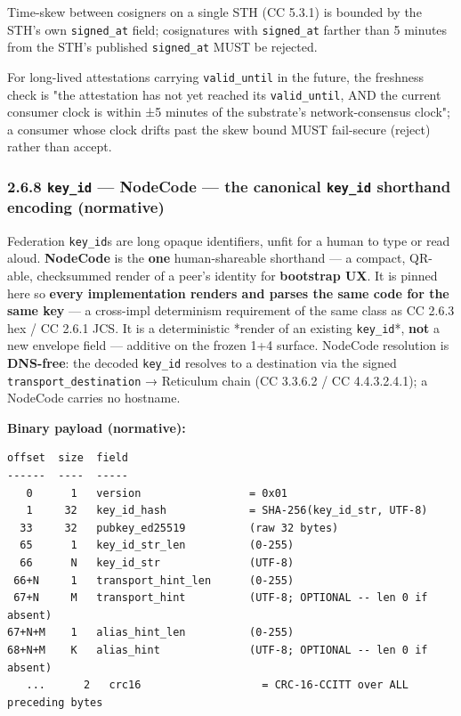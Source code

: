 \documentclass[11pt]{article}
\begin{document}
Time-skew between cosigners on a single STH (CC 5.3.1) is bounded by the STH's own \texttt{signed\_at} field; cosignatures with \texttt{signed\_at} farther than 5 minutes from the STH's published \texttt{signed\_at} MUST be rejected.


For long-lived attestations carrying \texttt{valid\_until} in the future, the freshness check is "the attestation has not yet reached its \texttt{valid\_until}, AND the current consumer clock is within ±5 minutes of the substrate's network-consensus clock"; a consumer whose clock drifts past the skew bound MUST fail-secure (reject) rather than accept.


\subsubsection*{2.6.8 \texttt{key\_id} — NodeCode — the canonical \texttt{key\_id} shorthand encoding (normative)}


Federation \texttt{key\_id}s are long opaque identifiers, unfit for a human to type or read aloud. \textbf{NodeCode} is the \textbf{one} human-shareable shorthand — a compact, QR-able, checksummed render of a peer's identity for \textbf{bootstrap UX}. It is pinned here so \textbf{every implementation renders and parses the same code for the same key} — a cross-impl determinism requirement of the same class as CC 2.6.3 hex / CC 2.6.1 JCS. It is a deterministic *render of an existing \texttt{key\_id}*, \textbf{not} a new envelope field — additive on the frozen 1+4 surface. NodeCode resolution is \textbf{DNS-free}: the decoded \texttt{key\_id} resolves to a destination via the signed \texttt{transport\_destination} → Reticulum chain (CC 3.3.6.2 / CC 4.4.3.2.4.1); a NodeCode carries no hostname.


\textbf{Binary payload (normative):}


\begin{lstlisting}
offset  size  field
------  ----  -----
   0      1   version                 = 0x01
   1     32   key_id_hash             = SHA-256(key_id_str, UTF-8)
  33     32   pubkey_ed25519          (raw 32 bytes)
  65      1   key_id_str_len          (0-255)
  66      N   key_id_str              (UTF-8)
 66+N     1   transport_hint_len      (0-255)
 67+N     M   transport_hint          (UTF-8; OPTIONAL -- len 0 if absent)
67+N+M    1   alias_hint_len          (0-255)
68+N+M    K   alias_hint              (UTF-8; OPTIONAL -- len 0 if absent)
   ...      2   crc16                   = CRC-16-CCITT over ALL preceding bytes
\end{lstlisting}
\end{document}
